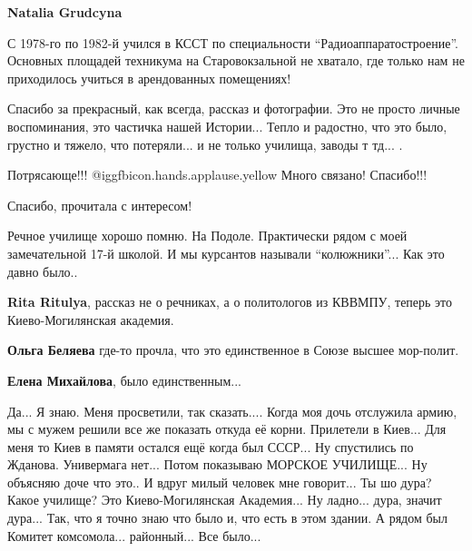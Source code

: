 \begin{itemize}
\begin{itemize} %
\textbf{Natalia Grudcyna} 

С 1978-го по 1982-й учился в КССТ по специальности \enquote{Радиоаппаратостроение}.
Основных площадей техникума на Старовокзальной не хватало, где только нам не
приходилось учиться в арендованных помещениях!

\end{itemize} %


Спасибо за прекрасный, как всегда, рассказ и фотографии. Это не просто личные
воспоминания, это частичка нашей Истории... Тепло и радостно, что это было,
грустно и тяжело, что потеряли... и не только училища, заводы т тд... .

Потрясающе!!!  @igg{fbicon.hands.applause.yellow}  Много связано! Спасибо!!!

Спасибо, прочитала с интересом!


Речное училище хорошо помню. На Подоле. Практически рядом с моей замечательной
17-й школой. И мы курсантов называли \enquote{колюжники}... Как это давно было..

\begin{itemize} %
\textbf{Rita Ritulya}, рассказ не о речниках, а о политологов из КВВМПУ, теперь это Киево-Могилянская академия.

\textbf{Ольга Беляева} где-то прочла, что это единственное в Союзе высшее мор-полит.

\textbf{Елена Михайлова}, было единственным...


Да... Я знаю. Меня просветили, так сказать.... Когда моя дочь отслужила армию, мы с
мужем решили все же показать откуда её корни. Прилетели в Киев... Для меня то
Киев в памяти остался ещё когда был СССР... Ну спустились по Жданова. Универмага
нет... Потом показываю МОРСКОЕ УЧИЛИЩЕ... Ну объясняю доче что это.. И вдруг
милый человек мне говорит... Ты шо дура? Какое училище? Это Киево-Могилянская
Академия... Ну ладно... дура, значит дура... Так, что я точно знаю что было и, что
есть в этом здании. А рядом был Комитет комсомола... районный... Все было...

\end{itemize} %



\end{itemize}
